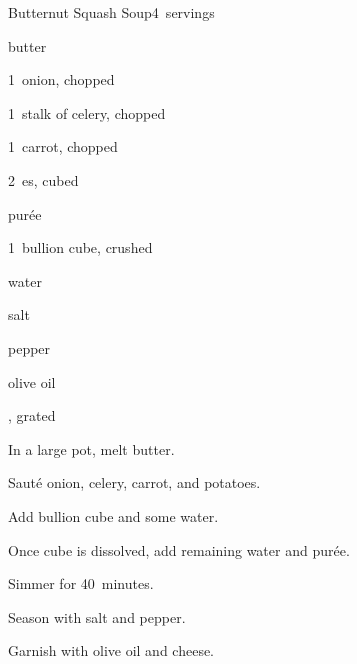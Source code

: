 \begin{recipe}{Butternut Squash Soup}{}{4~servings}

\begin{ingredients}
\item {} butter
\item 1~onion, chopped
\item 1~stalk of celery, chopped
\item 1~carrot, chopped
\item 2~es, cubed
\item {}  pur\'ee
\item 1~bullion cube, crushed
\item {} water
\item salt
\item pepper
\item olive oil
\item {}, grated
\end{ingredients}

\begin{directions}
\item In a large pot, melt butter.
\item Saut\'e onion, celery, carrot, and potatoes.
\item Add bullion cube and some water.
\item Once cube is dissolved, add remaining water and pur\'ee.
\item Simmer for 40~minutes.
\item Season with salt and pepper.
\item Garnish with olive oil and cheese.
\end{directions}

\end{recipe}
